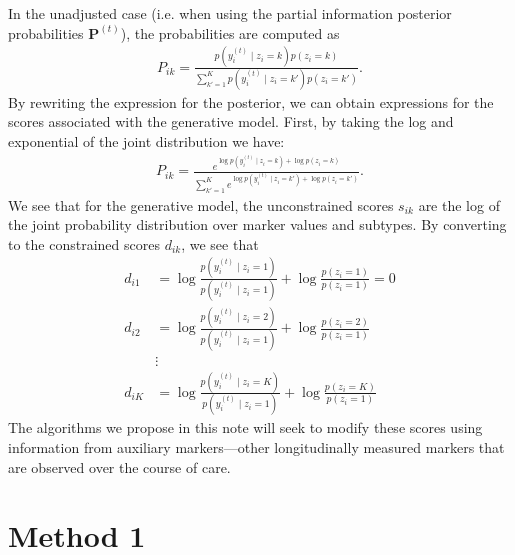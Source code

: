 \documentclass[12pt]{article}
\newcommand{\given}{\mid}
\newcommand{\psup}[1]{^{(#1)}}
\begin{document}
In the unadjusted case (i.e. when using the partial information posterior probabilities $\bm{P}\psup{t}$), the probabilities are computed as
\begin{align}
P_{ik} = \frac{p( y_i\psup{t} \given z_i = k ) p( z_i = k ) }
			        { \sum_{k' = 1}^K p( y_i\psup{t} \given z_i = k' ) p( z_i = k' ) }.
\end{align}
By rewriting the expression for the posterior, we can obtain expressions for the scores associated with the generative model. First, by taking the log and exponential of the joint distribution we have:
\begin{align}
P_{ik} = \frac{ e^{\log p( y_i\psup{t} \given z_i = k ) + \log p( z_i = k )} }
			        { \sum_{k' = 1}^K e^{ \log p( y_i\psup{t} \given z_i = k' ) + \log p( z_i = k' )} }.
\end{align}
We see that for the generative model, the unconstrained scores $s_{ik}$ are the log of the joint probability distribution over marker values and subtypes. By converting to the constrained scores $d_{ik}$, we see that
\begin{align}
d_{i1} &= \log \frac{p( y_i\psup{t} \given z_i = 1 )}{p( y_i\psup{t} \given z_i = 1 )} + \log \frac{p( z_i = 1 )}{p( z_i = 1 )} = 0 \\
d_{i2} &= \log \frac{p( y_i\psup{t} \given z_i = 2 )}{p( y_i\psup{t} \given z_i = 1 )} + \log \frac{p( z_i = 2 )}{p( z_i = 1 )}     \\
       &\vdots                                                                                                                      \\
d_{iK} &= \log \frac{p( y_i\psup{t} \given z_i = K )}{p( y_i\psup{t} \given z_i = 1 )} + \log \frac{p( z_i = K )}{p( z_i = 1 )}
\end{align}
The algorithms we propose in this note will seek to modify these scores using information from auxiliary markers---other longitudinally measured markers that are observed over the course of care.

\section{Method 1}
\end{document}
